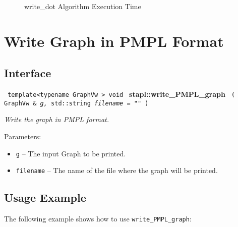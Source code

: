 \begin{figure}[p]
\caption{ write\_dot Algorithm Execution Time}
\label{fig:wr-dot-alg-exec-exper}
\end{figure}


\section{ Write Graph in PMPL Format}
\label{sec-wr-pmpl-alg}

\subsection{Interface} \label{sec-wr-pmpl-alg-inter}

\noindent
\texttt{%
template<typename GraphVw >
\newline
void
}
\newline
\textbf{stapl::write\_PMPL\_graph}%
\newline
\texttt{%
(
GraphVw \&
\textit{g,}%
std::string
\textit{filename = ""}%
)     
}
\vspace{0.4cm}

\textit{
Write the graph in PMPL format.
}
\vspace{0.4cm}

Parameters:
\begin{itemize}
\item
\texttt{g} --
The input Graph to be printed.
\item
\texttt{filename} --
The name of the file where the graph will be printed.
\end{itemize}

\subsection{Usage Example} \label{sec-wr-pmpl-alg-use}

The following example shows how to use 
\texttt{write\_PMPL\_graph}:


